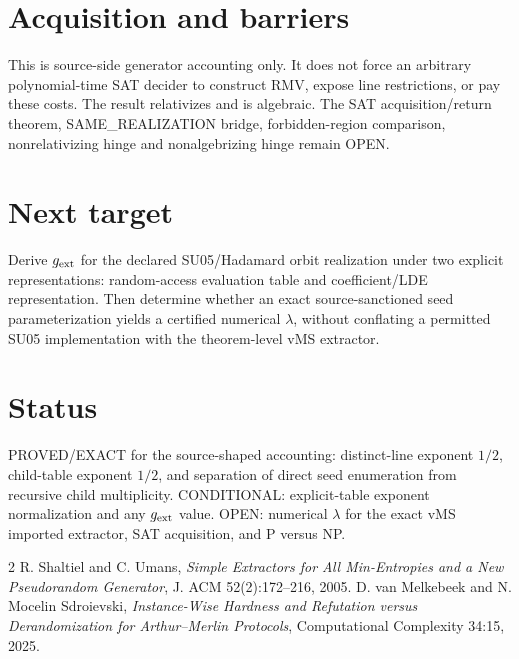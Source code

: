 \documentclass[11pt]{article}
\begin{document}
\section*{Acquisition and barriers}
This is source-side generator accounting only. It does not force an arbitrary polynomial-time SAT decider to construct RMV, expose line restrictions, or pay these costs. The result relativizes and is algebraic. The SAT acquisition/return theorem, SAME_REALIZATION bridge, forbidden-region comparison, nonrelativizing hinge and nonalgebrizing hinge remain OPEN.
\section*{Next target}
Derive $g_{\rm ext}$ for the declared SU05/Hadamard orbit realization under two explicit representations: random-access evaluation table and coefficient/LDE representation. Then determine whether an exact source-sanctioned seed parameterization yields a certified numerical $\lambda$, without conflating a permitted SU05 implementation with the theorem-level vMS extractor.
\section*{Status}
PROVED/EXACT for the source-shaped accounting: distinct-line exponent $1/2$, child-table exponent $1/2$, and separation of direct seed enumeration from recursive child multiplicity. CONDITIONAL: explicit-table exponent normalization and any $g_{\rm ext}$ value. OPEN: numerical $\lambda$ for the exact vMS imported extractor, SAT acquisition, and P versus NP.
\begin{thebibliography}{2}
 R. Shaltiel and C. Umans, \emph{Simple Extractors for All Min-Entropies and a New Pseudorandom Generator}, J. ACM 52(2):172--216, 2005.
 D. van Melkebeek and N. Mocelin Sdroievski, \emph{Instance-Wise Hardness and Refutation versus Derandomization for Arthur--Merlin Protocols}, Computational Complexity 34:15, 2025.
\end{thebibliography}
\end{document}
